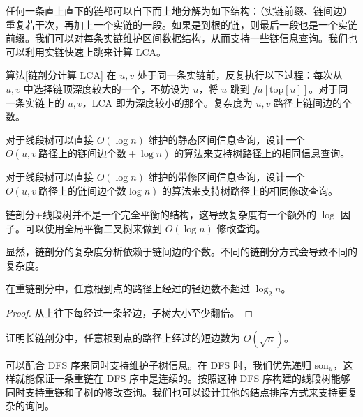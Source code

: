 任何一条直上直下的链都可以自下而上地分解为如下结构：（实链前缀、链间边）重复若干次，再加上一个实链的一段。如果是到根的链，则最后一段也是一个实链前缀。我们可以对每条实链维护区间数据结构，从而支持一些链信息查询。我们也可以利用实链快速上跳来计算 LCA。

\begin{descbox}{算法}[链剖分计算 LCA]
    在 $u,v$ 处于同一条实链前，反复执行以下过程：每次从 $u,v$ 中选择链顶深度较大的一个，不妨设为 $u$，将 $u$ 跳到 $fa[\mathrm{top}[u]]$。对于同一条实链上的 $u,v$，LCA 即为深度较小的那个。复杂度为 $u,v$ 路径上链间边的个数。
\end{descbox}

\begin{exercise}
    对于线段树可以直接 $O(\log n)$ 维护的静态区间信息查询，设计一个 $O(u,v\ \text{路径上的链间边个数}+\log n)$ 的算法来支持树路径上的相同信息查询。
\end{exercise}
\begin{exercise}
    对于线段树可以直接 $O(\log n)$ 维护的带修区间信息查询，设计一个 $O(u,v\ \text{路径上的链间边个数}\log n)$ 的算法来支持树路径上的相同修改查询。
\end{exercise}
\begin{remark}
    链剖分+线段树并不是一个完全平衡的结构，这导致复杂度有一个额外的 $\log$ 因子。可以使用全局平衡二叉树来做到 $O(\log n)$ 修改查询。
\end{remark}

显然，链剖分的复杂度分析依赖于链间边的个数。不同的链剖分方式会导致不同的复杂度。

\begin{lemma}
    在重链剖分中，任意根到点的路径上经过的轻边数不超过 $\log_2 n$。
\end{lemma}
\begin{proof}
    从上往下每经过一条轻边，子树大小至少翻倍。
\end{proof}
\begin{exercise}
    证明长链剖分中，任意根到点的路径上经过的短边数为 $O(\sqrt{n})$。
\end{exercise}

可以配合 DFS 序来同时支持维护子树信息。在 DFS 时，我们优先递归 $\mathrm{son}_u$，这样就能保证一条重链在 DFS 序中是连续的。按照这种 DFS 序构建的线段树能够同时支持重链和子树的修改查询。我们也可以设计其他的结点排序方式来支持更复杂的询问。

